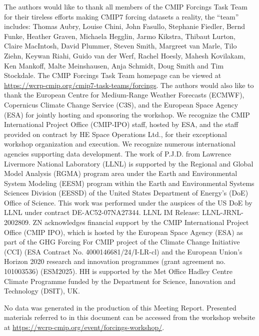 \documentclass{ametsocV6.1}
\begin{document}
\clearpage
\acknowledgments
The authors would like to thank all members of the CMIP Forcings Task Team for their tireless efforts making CMIP7 forcing datasets a reality, the ``team'' includes: Thomas Aubry, Louise Chini, John Fasullo, Stephanie Fiedler, Bernd Funke, Heather Graven, Michaela Hegglin, Jarmo Kikstra, Thibaut Lurton, Claire MacIntosh, David Plummer, Steven Smith, Margreet van Marle, Tilo Ziehn, Keywan Riahi, Guido van der Werf, Rachel Hoesly, Mahesh Kovilakam, Ken Mankoff, Malte Meinshausen, Anja Schmidt, Doug Smith and Tim Stockdale. The CMIP Forcings Task Team homepage can be viewed at \url{https://wcrp-cmip.org/cmip7-task-teams/forcings}. The authors would also like to thank the European Centre for Medium-Range Weather Forecasts (ECMWF), Copernicus Climate Change Service (C3S), and the European Space Agency (ESA) for jointly hosting and sponsoring the workshop. We recognize the CMIP International Project Office (CMIP-IPO) staff, hosted by ESA, and the staff provided on contract by HE Space Operations Ltd., for their exceptional workshop organization and execution. We recognize numerous international agencies supporting data development. The work of P.J.D. from Lawrence Livermore National Laboratory (LLNL) is supported by the Regional and Global Model Analysis (RGMA) program area under the Earth and Environmental System Modeling (EESM) program within the Earth and Environmental Systems Sciences Division (EESSD) of the United States Department of Energy’s (DoE) Office of Science. This work was performed under the auspices of the US DoE by LLNL under contract DE-AC52-07NA27344. LLNL IM Release: LLNL-JRNL-2002809. ZN acknowledges financial support by the CMIP International Project Office (CMIP IPO), which is hosted by the European Space Agency (ESA) as part of the GHG Forcing For CMIP project of the Climate Change Initiative (CCI) (ESA Contract No. 4000146681/24/I-LR-cl) and the European Union's Horizon 2020 research and innovation programmes (grant agreement no. 101003536) (ESM2025). HH is supported by the Met Office Hadley Centre Climate Programme funded by the Department for Science, Innovation and Technology (DSIT), UK.


\datastatement
No data was generated in the production of this Meeting Report. Presented materials referred to in this document can be accessed from the workshop website at \url{https://wcrp-cmip.org/event/forcings-workshop/}.




\end{document}
